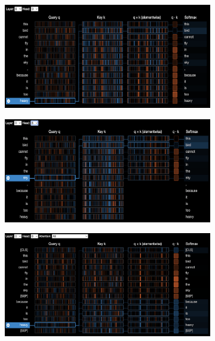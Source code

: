 \documentclass[]{article}
\begin{document}
\begin{figure}[!h]
    \centering
    \begin{subfigure}[b]{0.48\textwidth}
        \includegraphics[width=\textwidth]{FIGS/gpt2_neuron_L0H0_heavy.png}
    \end{subfigure} 
    \hfill
    \begin{subfigure}[b]{0.48\textwidth}
        \includegraphics[width=\textwidth]{FIGS/gpt2_neuron_L0H6_sky.png}
    \end{subfigure}
    \vfill
    \begin{subfigure}[b]{0.48\textwidth}
        \includegraphics[width=\textwidth]{FIGS/bert_neuron_L0H0_heavy.png}

\end{subfigure}
\end{figure}
\end{document}
